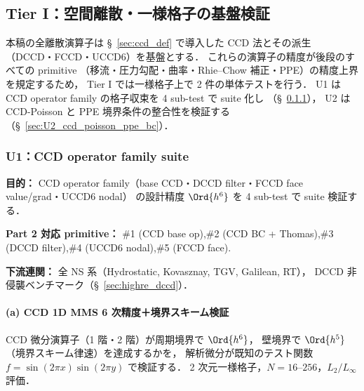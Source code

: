 %
\subsection{Tier I：空間離散・一様格子の基盤検証}
\label{sec:verify_spatial}

本稿の全離散演算子は §~\ref{sec:ccd_def} で導入した CCD 法とその派生
（DCCD・FCCD・UCCD6）を基盤とする．
これらの演算子の精度が後段のすべての primitive
（移流・圧力勾配・曲率・Rhie--Chow 補正・PPE）の精度上界を規定するため，
Tier I では一様格子上で 2 件の単体テストを行う．
U1 は CCD operator family の格子収束を 4 sub-test で suite 化し
（§~\ref{sec:U1_ccd_suite}），
U2 は CCD-Poisson と PPE 境界条件の整合性を検証する
（§~\ref{sec:U2_ccd_poisson_ppe_bc}）．

\subsubsection{U1：CCD operator family suite}
\label{sec:U1_ccd_suite}

\noindent\textbf{目的：}
CCD operator family（base CCD・DCCD filter・FCCD face value/grad・UCCD6 nodal）
の設計精度 $\Ord{h^6}$ を 4 sub-test で suite 検証する．

\noindent\textbf{Part 2 対応 primitive：}
\#1 (CCD base op),\#2 (CCD BC + Thomas),\#3 (DCCD filter),\#4 (UCCD6 nodal),\#5 (FCCD face).

\noindent\textbf{下流連関：}
全 NS 系（Hydrostatic, Kovasznay, TGV, Galilean, RT），
DCCD 非侵襲ベンチマーク（§~\ref{sec:highre_dccd}）．

\paragraph{(a) CCD 1D MMS 6 次精度＋境界スキーム検証}
\label{sec:verify_ccd_convergence}

CCD 微分演算子（1 階・2 階）が周期境界で $\Ord{h^6}$，
壁境界で $\Ord{h^5}$（境界スキーム律速）を達成するかを，
解析微分が既知のテスト関数 $f = \sin(2\pi x)\sin(2\pi y)$ で検証する．
2 次元一様格子，$N = 16$--$256$，$L_2/L_\infty$ 評価．

